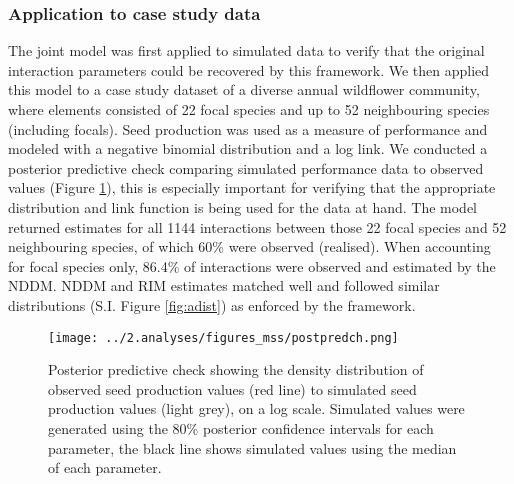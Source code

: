 \documentclass[a4,12pt]{article}
\begin{document}
    \subsubsection*{Application to case study data}

        The joint model was first applied to simulated data to verify that the original interaction parameters could be recovered by this framework. We then applied this model to a case study dataset of a diverse annual wildflower community, where elements consisted of 22 focal species and up to 52 neighbouring species (including focals). Seed production was used as a measure of performance and modeled with a negative binomial distribution and a log link. We conducted a posterior predictive check comparing simulated performance data to observed values (Figure \ref{fig:ppcheck}), this is especially important for verifying that the appropriate distribution and link function is being used for the data at hand. The model returned estimates for all 1144 interactions between those 22 focal species and 52 neighbouring species, of which 60\% were observed (realised).  When accounting for focal species only, 86.4\% of interactions were observed and estimated by the NDDM. NDDM and RIM estimates matched well and followed similar distributions (S.I. Figure \ref{fig:adist}) as enforced by the framework. 
    





    \begin{figure}[H]
        \texttt{[image: ../2.analyses/figures\_mss/postpredch.png]}
        \caption{Posterior predictive check showing the density distribution of observed seed production values (red line) to simulated seed production values (light grey), on a log scale. Simulated values were generated using the 80\% posterior confidence intervals for each parameter, the black line shows simulated values using the median of each parameter. }
        \label{fig:ppcheck}
    \end{figure}
  
\end{document}
